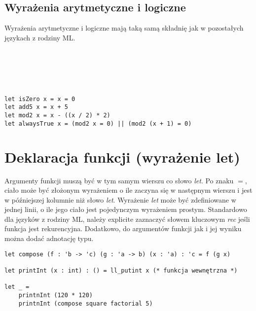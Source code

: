 \documentclass[declaration,shortabstract]{iithesis}
\begin{document}
\subsection{Wyrażenia arytmetyczne i logiczne}
Wyrażenia arytmetyczne i logiczne mają taką samą składnię jak w pozostałych
językach z rodziny ML.
\begin{bnf*}
    {    
    }\\
    {    
    }\\
    { \bnfts{+} \bnfor \bnfts{-} \bnfor \bnfts{*}
      \bnfor \bnfts{/} 
    }\\
    { \bnfts{\&\&} \bnfor \bnfts{$\|$} 
    }\\
\end{bnf*}


\begin{lstlisting}[frame=single, caption=Przykłady wyrażeń arytmetycznych i 
logicznych.]
let isZero x = x = 0 
let add5 x = x + 5
let mod2 x = x - ((x / 2) * 2)
let alwaysTrue x = (mod2 x = 0) || (mod2 (x + 1) = 0)
\end{lstlisting}

\section{Deklaracja funkcji (wyrażenie let)}

Argumenty funkcji muszą być w tym samym wierszu co słowo \textit{let}. Po znaku 
$=$, ciało może być złożonym wyrażeniem o ile zaczyna się w następnym wierszu i 
jest w późniejszej kolumnie niż słowo \textit{let}. Wyrażenie \textit{let} może być 
zdefiniowane w jednej linii, o ile jego ciało jest pojedynczym wyrażeniem prostym.
Standardowo dla języków z rodziny ML, należy explicite zaznaczyć słowem 
kluczowym \textit{rec} jeśli funkcja jest rekurencyjna. Dodatkowo, do argumentów
funkcji jak i jej wyniku można dodać adnotację typu.

\begin{lstlisting}[frame=single, caption=Deklaracja funkcji z anotacjami.]
let compose (f : 'b -> 'c) (g : 'a -> b) (x : 'a) : 'c = f (g x)

let printInt (x : int) : () = ll_putint x (* funkcja wewnętrzna *)

let _ = 
    printnInt (120 * 120)
    printnInt (compose square factorial 5)
\end{lstlisting}
\end{document}
